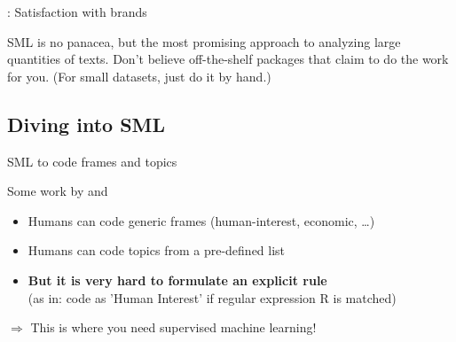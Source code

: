 \documentclass[compress]{beamer}
\begin{document}
\begin{frame}{\cite{Vermeer2019}: Satisfaction with brands}
\end{frame}



\begin{frame}[standout]
	SML is no panacea, but the most promising approach to analyzing large quantities of texts. Don't believe off-the-shelf packages that claim to do the work for you.
	(For small datasets, just do it by hand.)
\end{frame}




\subsection{Diving into SML}




\begin{frame}{SML to code frames and topics}
	\begin{block}{Some work by \cite{Burscher2014} and \cite{Burscher2015} }
		\begin{itemize}
			\item Humans can code generic frames (human-interest, economic, \ldots)
			\item Humans can code topics from a pre-defined list 
			\item<2->\textbf{But it is very hard to formulate an explicit rule} \\(as in: code as 'Human Interest' if regular expression R is matched)
		\end{itemize}
		$\Rightarrow$ This is where you need supervised machine learning!
	\end{block}
	
	
\end{frame}
\end{document}
